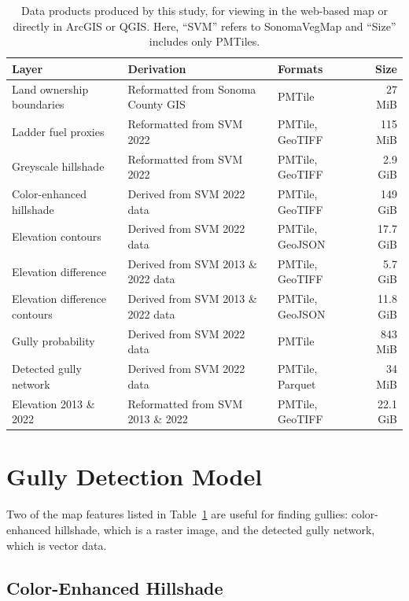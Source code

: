 \begin{table}
\centering
\small
\begin{tabular}{l l l r}
\toprule
Layer & Derivation & Formats & Size \\
\midrule
Land ownership boundaries & Reformatted from Sonoma County GIS & PMTile & 27 MiB \\
Ladder fuel proxies & Reformatted from SVM 2022 & PMTile, GeoTIFF & 115 MiB \\
Greyscale hillshade & Reformatted from SVM 2022 & PMTile, GeoTIFF & 2.9 GiB \\
Color-enhanced hillshade & Derived from SVM 2022 data & PMTile, GeoTIFF & 149 GiB \\
Elevation contours & Derived from SVM 2022 data & PMTile, GeoJSON & 17.7 GiB \\
Elevation difference & Derived from SVM 2013 \& 2022 data & PMTile, GeoTIFF & 5.7 GiB \\
Elevation difference contours & Derived from SVM 2013 \& 2022 data & PMTile, GeoJSON & 11.8 GiB \\
Gully probability & Derived from SVM 2022 data & PMTile & 843 MiB \\
Detected gully network & Derived from SVM 2022 data & PMTile, Parquet & 34 MiB \\
Elevation 2013 \& 2022 & Reformatted from SVM 2013 \& 2022 & PMTile, GeoTIFF & 22.1 GiB \\
\bottomrule
\end{tabular}

\caption{Data products produced by this study, for viewing in the web-based map or directly in ArcGIS or QGIS. Here, ``SVM'' refers to SonomaVegMap and ``Size'' includes only PMTiles.\label{tab:data-products}}
\end{table}

\section{Gully Detection Model}

Two of the map features listed in Table~\ref{tab:data-products} are useful for finding gullies: color-enhanced hillshade, which is a raster image, and the detected gully network, which is vector data.

\subsection{Color-Enhanced Hillshade}

